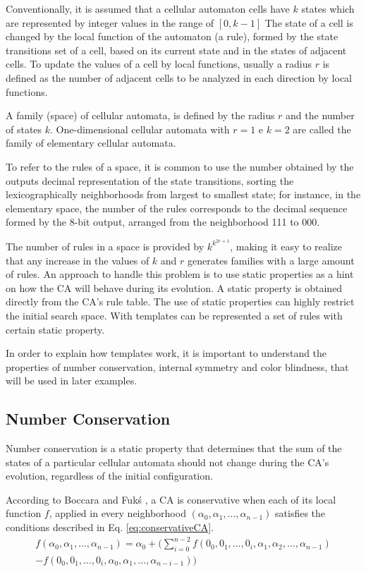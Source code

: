 \documentclass{llncs}
\begin{document}
Conventionally, it is assumed that a cellular automaton cells have $k$ states which are represented by integer values in the range of $[0, k-1]$ The state of a cell is changed by the local function of the automaton (a rule), formed by the state transitions set of a cell, based on its current state and in the states of adjacent cells. To update the values of a cell by local functions, usually a radius $r$ is defined as the number of adjacent cells to be analyzed in each direction by local functions.

A family (space) of cellular automata, is defined by the radius $r$ and the number of states $k$. One-dimensional cellular automata with $r=1$ e $k=2$ are called the family of elementary cellular automata.

To refer to the rules of a space, it is common to use the number obtained by the outputs decimal representation of the state transitions, sorting the lexicographically neighborhoods from largest to smallest state; for instance, in the elementary space, the number of the rules corresponds to the decimal sequence formed by the 8-bit output, arranged from the neighborhood 111 to 000.

The number of rules in a space is provided by $k^{k^{2r+1}}$, making it easy to realize that any increase in the values of $k$ and $r$ generates families with a large amount of rules. An approach to handle this problem is to use static properties as a hint on how the CA will behave during its evolution. A static property is obtained directly from the CA's rule table. The use of static properties can highly restrict the initial search space. With templates can be represented a set of rules with certain static property.

In order to explain how templates work, it is important to understand the properties of number conservation, internal symmetry and color blindness, that will be used in later examples.

\subsection{Number Conservation}
Number conservation is a static property that determines that the sum of the states of a particular cellular automata should not change during the CA's evolution, regardless of the initial configuration.

According to Boccara and Fukś \cite{boccara2002}, a CA is conservative when each of its local function $f$, applied in every neighborhood $(\alpha_0,\alpha_1, \dots, \alpha_{n-1})$ satisfies the conditions described in Eq. \ref{eq:conservativeCA}.
\begin{equation}
\begin{split}
f(\alpha_0,\alpha_1, \dots,\alpha_{n-1}) = \alpha_0 + (\sum_{i=0}^{n-2}f(0_0,0_1, \dots,0_i,\alpha_1,\alpha_2, \dots,\alpha_{n-1}) \\- f(0_0,0_1, \dots,0_i,\alpha_0,\alpha_1, \dots,\alpha_{n-i-1}))
\label{eq:conservativeCA}
\end{split}
\end{equation}
\end{document}

